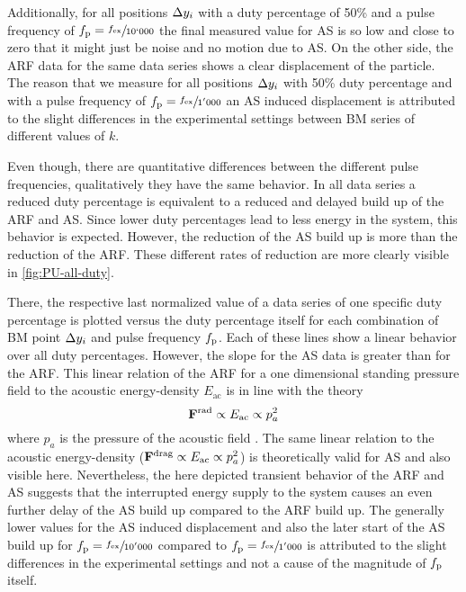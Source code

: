 Additionally, for all positions $\Delta y_{i}$ with a duty percentage of 50\% and a 
pulse frequency of $f_{\mathrm{p}}=\sfrac{f_{\mathrm{ex}}}{10`000}$ the final measured value for AS 
is so low and close to zero that it might just be noise and no motion due to 
AS. On the other side, the ARF data for the same data series shows a clear 
displacement of the particle. The reason that we measure for all positions 
$\Delta y_{i}$ with 50\% duty percentage and with a pulse frequency of 
$f_{\mathrm{p}}=\sfrac{f_{\mathrm{ex}}}{1'000}$ an AS induced displacement is attributed to the 
slight differences in the experimental settings between BM series of different 
values of $k$.

Even though, there are quantitative differences between the different pulse 
frequencies, qualitatively they have the same behavior. In all data series a 
reduced duty percentage is equivalent to a reduced and delayed build up of the 
ARF and AS. Since lower duty percentages lead to less energy in the system, 
this behavior is expected. However, the reduction of the AS build up is more 
than the reduction of the ARF. These different rates of reduction are more 
clearly visible in \cref{fig:PU-all-duty}.

There, the respective last normalized value of a data series of one specific 
duty percentage is plotted versus the duty percentage itself for each 
combination of BM point $\Delta y_{i}$ and pulse frequency $f_{\mathrm{p}}$. Each of these 
lines show a linear behavior over all duty percentages. However, the slope for 
the AS data is greater than for the ARF. This linear relation of the ARF for a 
one dimensional standing pressure field to the acoustic energy-density 
$E_{\mathrm{ac}}$ is in line with the theory
\begin{equation}
  \vb{F}^{\mathrm{rad}}\propto E_{\mathrm{ac}} \propto p_{a}^{2}
\end{equation}
where $p_{a}$ is the pressure of the acoustic field 
\cite{Gorkov1962,Bruus2012}. The same linear relation to the acoustic 
energy-density ($\vb{F}^{\mathrm{drag}}\propto E_{\mathrm{ac}}\propto p_{a}^{2}$) is 
theoretically valid for AS \cite{Bach2020} and also visible here. Nevertheless, 
the here depicted transient behavior of the ARF and AS suggests that the 
interrupted energy supply to the system causes an even further delay of the AS 
build up compared to the ARF build up. The generally lower values for the AS 
induced displacement and also the later start of the AS build up for 
$f_{\mathrm{p}}=\sfrac{f_{\mathrm{ex}}}{10'000}$ compared to $f_{\mathrm{p}}=\sfrac{f_{\mathrm{ex}}}{1'000}$ is attributed 
to the slight differences in the experimental settings and not a cause of the 
magnitude of $f_{\mathrm{p}}$ itself.

